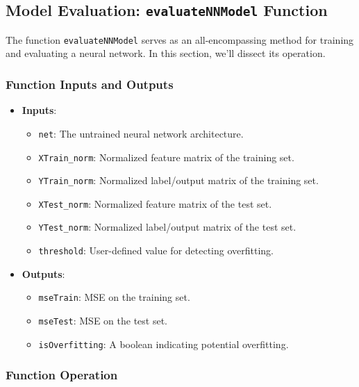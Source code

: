 \subsection{Model Evaluation: \texttt{evaluateNNModel} Function}

The function \texttt{evaluateNNModel} serves as an all-encompassing method for training and evaluating a neural network. In this section, we'll dissect its operation.

\subsubsection{Function Inputs and Outputs}

\begin{itemize}
    \item \textbf{Inputs}:
    \begin{itemize}
        \item \texttt{net}: The untrained neural network architecture.
        \item \texttt{XTrain\_norm}: Normalized feature matrix of the training set.
        \item \texttt{YTrain\_norm}: Normalized label/output matrix of the training set.
        \item \texttt{XTest\_norm}: Normalized feature matrix of the test set.
        \item \texttt{YTest\_norm}: Normalized label/output matrix of the test set.
        \item \texttt{threshold}: User-defined value for detecting overfitting.
    \end{itemize}
    \item \textbf{Outputs}:
    \begin{itemize}
        \item \texttt{mseTrain}: MSE on the training set.
        \item \texttt{mseTest}: MSE on the test set.
        \item \texttt{isOverfitting}: A boolean indicating potential overfitting.
    \end{itemize}
\end{itemize}

\subsubsection{Function Operation}

